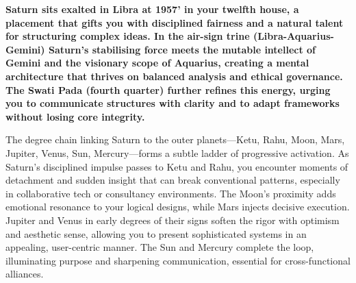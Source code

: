 
\label{topic35}

{\fontsize{9.5}{13.8}\selectfont\bfseries\color{DeepSlate} Saturn sits exalted in Libra at 19\textdegree{}57' in your twelfth house, a placement that gifts you with disciplined fairness and a natural talent for structuring complex ideas. In the air-sign trine (Libra-Aquarius-Gemini) Saturn's stabilising force meets the mutable intellect of Gemini and the visionary scope of Aquarius, creating a mental architecture that thrives on balanced analysis and ethical governance. The Swati Pada (fourth quarter) further refines this energy, urging you to communicate structures with clarity and to adapt frameworks without losing core integrity.}\par\vspace{2mm}

{\fontsize{9}{13}\selectfont The degree chain linking Saturn to the outer planets---Ketu, Rahu, Moon, Mars, Jupiter, Venus, Sun, Mercury---forms a subtle ladder of progressive activation. As Saturn's disciplined impulse passes to Ketu and Rahu, you encounter moments of detachment and sudden insight that can break conventional patterns, especially in collaborative tech or consultancy environments. The Moon's proximity adds emotional resonance to your logical designs, while Mars injects decisive execution. Jupiter and Venus in early degrees of their signs soften the rigor with optimism and aesthetic sense, allowing you to present sophisticated systems in an appealing, user-centric manner. The Sun and Mercury complete the loop, illuminating purpose and sharpening communication, essential for cross-functional alliances.}\par\vspace{1.8mm}

